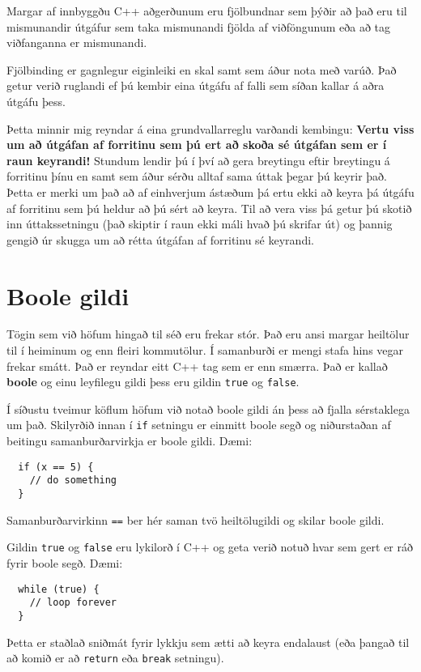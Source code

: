 Margar af innbyggðu C++ aðgerðunum eru fjölbundnar sem þýðir að það eru til mismunandir útgáfur sem taka mismunandi fjölda af viðföngunum eða að tag viðfanganna er mismunandi.

Fjölbinding er gagnlegur eiginleiki en skal samt sem áður nota með varúð.
Það getur verið ruglandi ef þú kembir eina útgáfu af falli sem síðan kallar á aðra útgáfu þess.

Þetta minnir mig reyndar á eina grundvallarreglu varðandi kembingu:
{\bf Vertu viss um að útgáfan af forritinu sem þú ert að skoða sé útgáfan sem er í raun keyrandi!}
Stundum lendir þú í því að gera breytingu eftir breytingu á forritinu þínu en samt sem áður sérðu alltaf sama úttak þegar þú keyrir það.
Þetta er merki um það að af einhverjum ástæðum þá ertu ekki að keyra þá útgáfu af forritinu sem þú heldur að þú sért að keyra.
Til að vera viss þá getur þú skotið inn úttakssetningu (það skiptir í raun ekki máli hvað þú skrifar út) og þannig gengið úr skugga um að rétta útgáfan af forritinu sé keyrandi.

\section{Boole gildi}

Tögin sem við höfum hingað til séð eru frekar stór.
Það eru ansi margar heiltölur til í heiminum og enn fleiri kommutölur.
Í samanburði er mengi stafa hins vegar frekar smátt.
Það er reyndar eitt C++ tag sem er enn smærra.
Það er kallað {\bf boole} og einu leyfilegu gildi þess eru gildin {\tt true} og {\tt false}.

Í síðustu tveimur köflum höfum við notað boole gildi án þess að fjalla sérstaklega um það.
Skilyrðið innan í {\tt if} setningu er einmitt boole segð og niðurstaðan af beitingu samanburðarvirkja er boole gildi.
Dæmi:

\begin{verbatim}
  if (x == 5) {
    // do something
  }
\end{verbatim}
%
Samanburðarvirkinn {\tt ==} ber hér saman tvö heiltölugildi og skilar boole gildi.


Gildin {\tt true} og {\tt false} eru lykilorð í C++ 
og geta verið notuð hvar sem gert er ráð fyrir boole segð.
Dæmi:  

\begin{verbatim}
  while (true) {
    // loop forever
  }
\end{verbatim}
%
Þetta er staðlað sniðmát fyrir lykkju sem ætti að keyra endalaust (eða þangað til að komið er að {\tt return} eða {\tt break} setningu).

